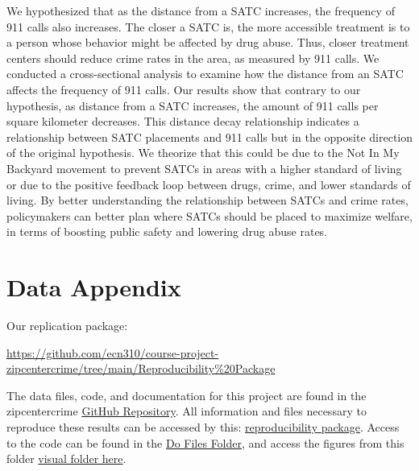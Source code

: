 \documentclass[12pt]{article}
\begin{document}
We hypothesized that as the distance from a SATC increases, the frequency of 911 calls also increases. The closer a SATC is, the more accessible treatment is to a person whose behavior might be affected by drug abuse. Thus, closer treatment centers should reduce crime rates in the area, as measured by 911 calls. We conducted a cross-sectional analysis to examine how the distance from an SATC affects the frequency of 911 calls. Our results show that contrary to our hypothesis, as distance from a SATC increases, the amount of 911 calls per square kilometer decreases. This distance decay relationship indicates a relationship between SATC placements and 911 calls but in the opposite direction of the original hypothesis. We theorize that this could be due to the Not In My Backyard movement to prevent SATCs in areas with a higher standard of living or due to the positive feedback loop between drugs, crime, and lower standards of living. By better understanding the relationship between SATCs and crime rates, policymakers can better plan where SATCs should be placed to maximize welfare, in terms of boosting public safety and lowering drug abuse rates. 


 

\newpage
\singlespacing
\setlength\bibsep{0pt}





\newpage
\section*{Data Appendix} \label{sec:appendixa}

Our replication package:

\href{https://github.com/ecn310/course-project-zipcentercrime/tree/main/Reproducibility%20Package}{https://github.com/ecn310/course-project-zipcentercrime/tree/main/Reproducibility\%20Package}

\vspace{10pt}


The data files, code, and documentation for this project are found in the zipcentercrime \href{https://github.com/ecn310/course-project-zipcentercrime}{GitHub Repository}. All information and files necessary to reproduce these results can be accessed by this: \href{https://github.com/ecn310/course-project-zipcentercrime/tree/main/Reproducibility%20Package}{reproducibility package}. Access to the code can be found in the \href{https://github.com/ecn310/course-project-zipcentercrime/tree/main/Reproducibility%20Package/Do%20files}{Do Files Folder}, and access the figures from this folder \href{https://github.com/ecn310/course-project-zipcentercrime/tree/main/Reproducibility%20Package/Visual%20Graphics}{visual folder here}. 
\end{document}
